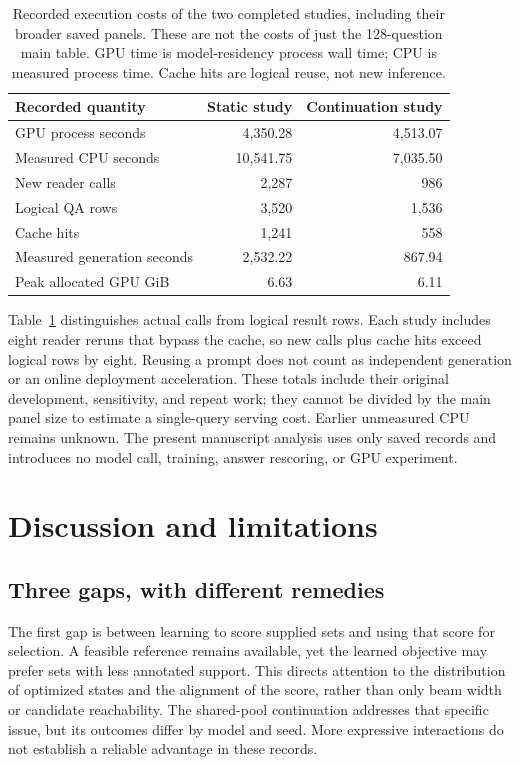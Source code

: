 \documentclass[preprint,12pt]{elsarticle}
\begin{document}
\begin{table}[t]\centering\small
\caption{Recorded execution costs of the two completed studies, including their broader saved panels. These are not the costs of just the 128-question main table. GPU time is model-residency process wall time; CPU is measured process time. Cache hits are logical reuse, not new inference.}\label{tab:cost}
\begin{tabular}{lrr}\toprule
Recorded quantity & Static study & Continuation study\\\midrule
GPU process seconds & 4,350.28 & 4,513.07\\
Measured CPU seconds & 10,541.75 & 7,035.50\\
New reader calls & 2,287 & 986\\
Logical QA rows & 3,520 & 1,536\\
Cache hits & 1,241 & 558\\
Measured generation seconds & 2,532.22 & 867.94\\
Peak allocated GPU GiB & 6.63 & 6.11\\\bottomrule
\end{tabular}\end{table}

Table~\ref{tab:cost} distinguishes actual calls from logical result rows. Each study includes eight reader reruns that bypass the cache, so new calls plus cache hits exceed logical rows by eight. Reusing a prompt does not count as independent generation or an online deployment acceleration. These totals include their original development, sensitivity, and repeat work; they cannot be divided by the main panel size to estimate a single-query serving cost. Earlier unmeasured CPU remains unknown. The present manuscript analysis uses only saved records and introduces no model call, training, answer rescoring, or GPU experiment.

\section{Discussion and limitations}
\subsection{Three gaps, with different remedies}
The first gap is between learning to score supplied sets and using that score for selection. A feasible reference remains available, yet the learned objective may prefer sets with less annotated support. This directs attention to the distribution of optimized states and the alignment of the score, rather than only beam width or candidate reachability. The shared-pool continuation addresses that specific issue, but its outcomes differ by model and seed. More expressive interactions do not establish a reliable advantage in these records.
\end{document}
